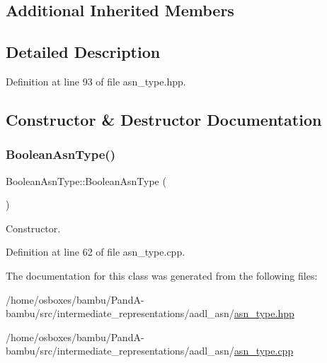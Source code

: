 \subsection*{Additional Inherited Members}


\subsection{Detailed Description}


Definition at line 93 of file asn\+\_\+type.\+hpp.



\subsection{Constructor \& Destructor Documentation}
\mbox{\label{classBooleanAsnType_af7d54c0e8084031a730aa709d3cf9185}} 
\subsubsection{\texorpdfstring{Boolean\+Asn\+Type()}{BooleanAsnType()}}
{\footnotesize\ttfamily Boolean\+Asn\+Type\+::\+Boolean\+Asn\+Type (\begin{DoxyParamCaption}{ }\end{DoxyParamCaption})}



Constructor. 



Definition at line 62 of file asn\+\_\+type.\+cpp.



The documentation for this class was generated from the following files\+:\begin{DoxyCompactItemize}
\item 
/home/osboxes/bambu/\+Pand\+A-\/bambu/src/intermediate\+\_\+representations/aadl\+\_\+asn/\hyperlink{asn__type_8hpp}{asn\+\_\+type.\+hpp}\item 
/home/osboxes/bambu/\+Pand\+A-\/bambu/src/intermediate\+\_\+representations/aadl\+\_\+asn/\hyperlink{asn__type_8cpp}{asn\+\_\+type.\+cpp}\end{DoxyCompactItemize}
